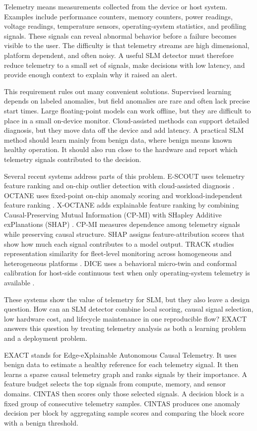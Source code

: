 Telemetry means measurements collected from the device or host system. Examples include performance counters, memory counters, power readings, voltage readings, temperature sensors, operating-system statistics, and profiling signals. These signals can reveal abnormal behavior before a failure becomes visible to the user. The difficulty is that telemetry streams are high dimensional, platform dependent, and often noisy. A useful SLM detector must therefore reduce telemetry to a small set of signals, make decisions with low latency, and provide enough context to explain why it raised an alert.

This requirement rules out many convenient solutions. Supervised learning depends on labeled anomalies, but field anomalies are rare and often lack precise start times. Large floating-point models can work offline, but they are difficult to place in a small on-device monitor. Cloud-assisted methods can support detailed diagnosis, but they move data off the device and add latency. A practical SLM method should learn mainly from benign data, where benign means known healthy operation. It should also run close to the hardware and report which telemetry signals contributed to the decision.

Several recent systems address parts of this problem. E-SCOUT uses telemetry feature ranking and on-chip outlier detection with cloud-assisted diagnosis \cite{escout}. OCTANE uses fixed-point on-chip anomaly scoring and workload-independent feature ranking \cite{octane}. X-OCTANE adds explainable feature ranking by combining Causal-Preserving Mutual Information (CP-MI) with SHapley Additive exPlanations (SHAP) \cite{xoctane}. CP-MI measures dependence among telemetry signals while preserving causal structure. SHAP assigns feature-attribution scores that show how much each signal contributes to a model output. TRACK studies representation similarity for fleet-level monitoring across homogeneous and heterogeneous platforms \cite{track}. DICE uses a behavioral micro-twin and conformal calibration for host-side continuous test when only operating-system telemetry is available \cite{dice}.

These systems show the value of telemetry for SLM, but they also leave a design question. How can an SLM detector combine local scoring, causal signal selection, low hardware cost, and lifecycle maintenance in one reproducible flow? EXACT answers this question by treating telemetry analysis as both a learning problem and a deployment problem.

EXACT stands for Edge-eXplainable Autonomous Causal Telemetry. It uses benign data to estimate a healthy reference for each telemetry signal. It then learns a sparse causal telemetry graph and ranks signals by their importance. A feature budget selects the top signals from compute, memory, and sensor domains. CINTAS then scores only those selected signals. A decision block is a fixed group of consecutive telemetry samples. CINTAS produces one anomaly decision per block by aggregating sample scores and comparing the block score with a benign threshold.

